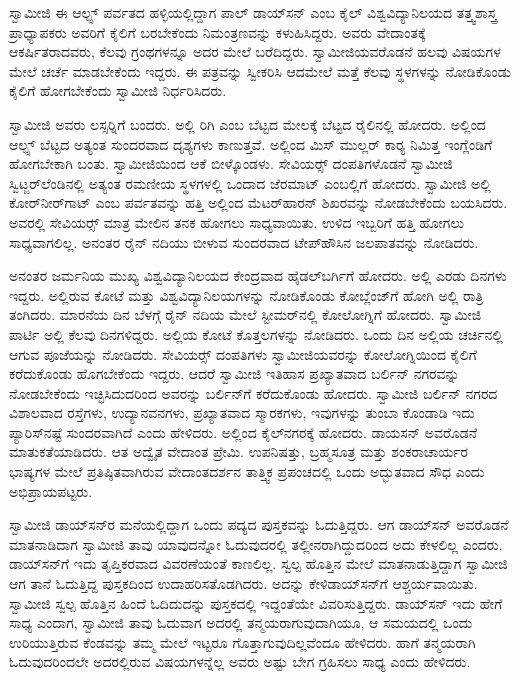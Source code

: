  ಸ್ವಾಮೀಜಿ ಈ ಆಲ್ಫ್ಸ್ ಪರ್ವತದ ಹಳ್ಳಿಯಲ್ಲಿದ್ದಾಗ ಪಾಲ್ ಡಾಯ್‍ಸನ್ ಎಂಬ ಕೈಲ್ ವಿಶ್ವವಿದ್ಯಾನಿಲಯದ ತತ್ತ್ವಶಾಸ್ತ್ರ ಪ್ರಾಧ್ಯಾಪಕರು ಅವರಿಗೆ ಕೈಲಿಗೆ ಬರಬೇಕೆಂದು ನಿಮಂತ್ರಣವನ್ನು ಕಳುಹಿಸಿದ್ದರು. ಅವರು ವೇದಾಂತಕ್ಕೆ ಆಕರ್ಷಿತರಾದವರು, ಕೆಲವು ಗ್ರಂಥಗಳನ್ನೂ ಅದರ ಮೇಲೆ ಬರೆದಿದ್ದರು. ಸ್ವಾಮೀಜಿಯವರೊಡನೆ ಹಲವು ವಿಷಯಗಳ ಮೇಲೆ ಚರ್ಚೆ ಮಾಡಬೇಕೆಂದು ಇದ್ದರು. ಈ ಪತ್ರವನ್ನು ಸ್ವೀಕರಿಸಿ ಆದಮೇಲೆ ಮತ್ತೆ ಕೆಲವು ಸ್ಥಳಗಳನ್ನು ನೋಡಿಕೊಂಡು ಕೈಲಿಗೆ ಹೋಗಬೇಕೆಂದು ಸ್ವಾಮೀಜಿ ನಿರ್ಧರಿಸಿದರು. 

 ಸ್ವಾಮೀಜಿ ಅವರು ಲಸ್ಸರ‍್ನಿಗೆ ಬಂದರು. ಅಲ್ಲಿ ರಿಗಿ ಎಂಬ ಬೆಟ್ಟದ ಮೇಲಕ್ಕೆ ಬೆಟ್ಟದ ರೈಲಿನಲ್ಲಿ ಹೋದರು. ಅಲ್ಲಿಂದ ಆಲ್ಫ್ಸ್ ಬೆಟ್ಟದ ಅತ್ಯಂತ ಸುಂದರವಾದ ದೃಶ್ಯಗಳು ಕಾಣುತ್ತವೆ. ಅಲ್ಲಿಂದ ಮಿಸ್ ಮುಲ್ಲರ್ ಕಾರ‍್ಯ ನಿಮಿತ್ತ ಇಂಗ್ಲೆಂಡಿಗೆ ಹೋಗಬೇಕಾಗಿ ಬಂತು. ಸ್ವಾಮೀಜಿಯಿಂದ ಆಕೆ ಬೀಳ್ಕೊಂಡಳು. ಸೇವಿಯರ್ಸ್‍‍ ದಂಪತಿಗಳೊಡನೆ ಸ್ವಾಮೀಜಿ ಸ್ವಿಟ್ಜರ್‌ಲೆಂಡಿನಲ್ಲಿ ಅತ್ಯಂತ ರಮಣೀಯ ಸ್ಥಳಗಳಲ್ಲಿ ಒಂದಾದ ಜೆರಮಾಟ್ ಎಂಬಲ್ಲಿಗೆ ಹೋದರು. ಸ್ವಾಮೀಜಿ ಅಲ್ಲಿ ಕೋರ್‌ನೀರ್‌ಗಾಟ್ ಎಂಬ ಪರ್ವತವನ್ನು ಹತ್ತಿ ಅಲ್ಲಿಂದ ಮೆಟರ್‌ಹಾರನ್ ಶಿಖರವನ್ನು ನೋಡಬೇಕೆಂದು ಬಯಸಿದರು. ಅವರಲ್ಲಿ ಸೇವಿಯರ್ಸ್‍‍ ಮಾತ್ರ ಮೇಲಿನ ತನಕ ಹೋಗಲು ಸಾಧ್ಯವಾಯಿತು. ಉಳಿದ ಇಬ್ಬರಿಗೆ ಹತ್ತಿ ಹೋಗಲು ಸಾಧ್ಯವಾಗಲಿಲ್ಲ. ಅನಂತರ ರೈನ್ ನದಿಯು ಬೀಳುವ ಸುಂದರವಾದ ಟೇಪ್‍ಹೌಸಿನ ಜಲಪಾತವನ್ನು ನೋಡಿದರು. 

 ಅನಂತರ ಜರ್ಮನಿಯ ಮುಖ್ಯ ವಿಶ್ವವಿದ್ಯಾನಿಲಯದ ಕೇಂದ್ರವಾದ ಹೈಡಲ್‍ಬರ್ಗಿಗೆ ಹೋದರು. ಅಲ್ಲಿ ಎರಡು ದಿನಗಳು ಇದ್ದರು. ಅಲ್ಲಿರುವ ಕೋಟೆ ಮತ್ತು ವಿಶ್ವವಿದ್ಯಾನಿಲಯಗಳನ್ನು ನೋಡಿಕೊಂಡು ಕೋಬ್ಲೆಂಜ್‍ಗೆ ಹೋಗಿ ಅಲ್ಲಿ ರಾತ್ರಿ ತಂಗಿದರು. ಮಾರನೆಯ ದಿನ ಬೆಳಗ್ಗೆ ರೈನ್ ನದಿಯ ಮೇಲೆ ಸ್ಟೀಮರ್‌ನಲ್ಲಿ ಕೋಲೋಗ್ನಿಗೆ ಹೋದರು. ಸ್ವಾಮೀಜಿ ಪಾರ್ಟಿ ಅಲ್ಲಿ ಕೆಲವು ದಿನಗಳಿದ್ದರು. ಅಲ್ಲಿಯ ಕೋಟೆ ಕೊತ್ತಲಗಳನ್ನು ನೋಡಿದರು. ಒಂದು ದಿನ ಅಲ್ಲಿಯ ಚರ್ಚಿನಲ್ಲಿ ಆಗುವ ಪೂಜೆಯನ್ನು ನೋಡಿದರು. ಸೇವಿಯರ್ಸ್‍‍ ದಂಪತಿಗಳು ಸ್ವಾಮೀಜಿಯವರನ್ನು ಕೋಲೋಗ್ನಿಯಿಂದ ಕೈಲಿಗೆ ಕರೆದುಕೊಂಡು ಹೊಗಬೇಕೆಂದು ಇದ್ದರು. ಆದರೆ ಸ್ವಾಮೀಜಿ ಇತಿಹಾಸ ಪ್ರಖ್ಯಾತವಾದ ಬರ್ಲಿನ್ ನಗರವನ್ನು ನೋಡಬೇಕೆಂದು ಇಚ್ಛಿಸಿದುದರಿಂದ ಅವರನ್ನು ಬರ್ಲಿನ್‍ಗೆ ಕರೆದುಕೊಂಡು ಹೋದರು. ಸ್ವಾಮೀಜಿ ಬರ್ಲಿನ್ ನಗರದ ವಿಶಾಲವಾದ ರಸ್ತೆಗಳು, ಉದ್ಯಾನವನಗಳು, ಪ್ರಖ್ಯಾತವಾದ ಸ್ಮಾರಕಗಳು, ಇವುಗಳನ್ನು ತುಂಬಾ ಕೊಂಡಾಡಿ ಇದು ಪ್ಯಾರಿಸ್‍ನಷ್ಟೆ ಸುಂದರವಾಗಿದೆ ಎಂದು ಹೇಳಿದರು. ಅಲ್ಲಿಂದ ಕೈಲ್‍ನಗರಕ್ಕೆ ಹೋದರು. ಡಾಯಸನ್ ಅವರೊಡನೆ ಮಾತುಕತೆಯಾಡಿದರು. ಆತ ಅದ್ವೈತ ವೇದಾಂತ ಪ್ರೇಮಿ. ಉಪನಿಷತ್ತು, ಬ್ರಹ್ಮಸೂತ್ರ ಮತ್ತು ಶಂಕರಾಚಾರ್ಯರ ಭಾಷ್ಯಗಳ ಮೇಲೆ ಪ್ರತಿಷ್ಠಿತವಾಗಿರುವ ವೇದಾಂತದರ್ಶನ ತಾತ್ತ್ವಿಕ ಪ್ರಪಂಚದಲ್ಲಿ ಒಂದು ಅದ್ಭುತವಾದ ಸೌಧ ಎಂದು ಅಭಿಪ್ರಾಯಪಟ್ಟರು. 

 ಸ್ವಾಮೀಜಿ ಡಾಯ್‍ಸನ್‍ರ ಮನೆಯಲ್ಲಿದ್ದಾಗ ಒಂದು ಪದ್ಯದ ಪುಸ್ತಕವನ್ನು ಓದುತ್ತಿದ್ದರು. ಆಗ ಡಾಯ್‍ಸನ್‍ ಅವರೊಡನೆ ಮಾತನಾಡಿದಾಗ ಸ್ವಾಮೀಜಿ ತಾವು ಯಾವುದನ್ನೋ ಓದುವುದರಲ್ಲಿ ತಲ್ಲೀನರಾಗಿದ್ದುದರಿಂದ ಅದು ಕೇಳಲಿಲ್ಲ ಎಂದರು. ಡಾಯ್‍ಸನ್‍ಗೆ ಇದು ತೃಪ್ತಿಕರವಾದ ವಿವರಣೆಯಂತೆ ಕಾಣಲಿಲ್ಲ. ಸ್ವಲ್ಪ ಹೊತ್ತಿನ ಮೇಲೆ ಮಾತನಾಡುತ್ತಿದ್ದಾಗ ಸ್ವಾಮೀಜಿ ಆಗ ತಾನೆ ಓದುತ್ತಿದ್ದ ಪುಸ್ತಕದಿಂದ ಉದಾಹರಿಸತೊಡಗಿದರು. ಅದನ್ನು ಕೇಳಿ\break ಡಾಯ್‍ಸನ್‍ಗೆ ಆಶ್ಚರ್ಯವಾಯಿತು. ಸ್ವಾಮೀಜಿ ಸ್ವಲ್ಪ ಹೊತ್ತಿನ ಹಿಂದೆ ಓದಿದುದನ್ನು ಪುಸ್ತಕದಲ್ಲಿ ಇದ್ದಂತೆಯೇ ವಿವರಿಸುತ್ತಿದ್ದರು. ಡಾಯ್‍ಸನ್‍ ಇದು ಹೇಗೆ ಸಾಧ್ಯ ಎಂದಾಗ, ಸ್ವಾಮೀಜಿ ತಾವು ಓದುವಾಗ ಅದರಲ್ಲಿ ತನ್ಮಯರಾಗುವುದಾಗಿಯೂ, ಆ ಸಮಯದಲ್ಲಿ ಒಂದು ಉರಿಯುತ್ತಿರುವ ಕೆಂಡವನ್ನು ತಮ್ಮ ಮೇಲೆ ಇಟ್ಟರೂ ಗೊತ್ತಾಗುವುದಿಲ್ಲವೆಂದೂ ಹೇಳಿದರು. ಹಾಗೆ ತನ್ಮಯರಾಗಿ ಓದುವುದರಿಂದಲೇ ಅದರಲ್ಲಿರುವ ವಿಷಯಗಳನ್ನೆಲ್ಲ ಅವರು ಅಷ್ಟು ಬೇಗ ಗ್ರಹಿಸಲು ಸಾಧ್ಯ ಎಂದು ಹೇಳಿದರು. 


